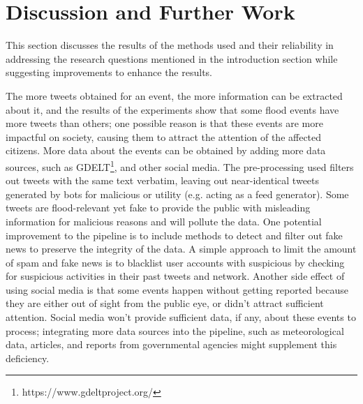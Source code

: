\chapter{Discussion and Further Work}\label{sec:discussion_and_further_work}
This section discusses the results of the methods used and their reliability in addressing the
research questions mentioned in the introduction section while suggesting improvements to enhance
the results.

The more tweets obtained for an event, the more information can be extracted about it, and the
results of the experiments show that some flood events have more tweets than others; one possible
reason is that these events are more impactful on society, causing them to attract the attention of
the affected citizens. More data about the events can be obtained by adding more data sources, such
as \ac{GDELT}\footnote{https://www.gdeltproject.org/}, and other social media. The pre-processing
used filters out tweets with the same text verbatim, leaving out near-identical tweets generated by
bots for malicious or utility (e.g. acting as a feed generator). Some tweets are flood-relevant yet
fake to provide the public with misleading information for malicious reasons and will pollute the
data. One potential improvement to the pipeline is to include methods to detect and filter out fake
news to preserve the integrity of the data. A simple approach to limit the amount of spam and fake
news is to blacklist user accounts with suspicious by checking for suspicious activities in their
past tweets and network. Another side effect of using social media is that some events happen
without getting reported because they are either out of sight from the public eye, or didn't attract
sufficient attention. Social media won't provide sufficient data, if any, about these events to
process; integrating more data sources into the pipeline, such as meteorological data, articles, and
reports from governmental agencies might supplement this deficiency.

